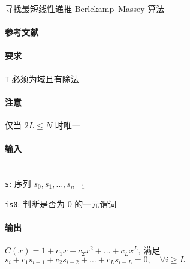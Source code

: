 寻找最短线性递推 Berlekamp--Massey 算法

\paragraph{参考文献} \cite{massey1969shift}

\paragraph{要求} \verb|T| 必须为域且有除法

\paragraph{注意} 仅当 \(2L \leq N\) 时唯一

\paragraph{输入}~\\

\verb|s|: 序列 \(s_0, s_1, \dots, s_{n-1}\)

\verb|is0|: 判断是否为 \(0\) 的一元谓词

\paragraph{输出}

\(C(x)=1+c_{1}x+c_{2}x^{2}+\dots+c_{L}x^{L}\), 满足 \(s_{i} + c_{1}s_{i-1} + c_{2}s_{i-2} + \dots + c_{L}s_{i-L} = 0,\quad\forall i\geq L\)
